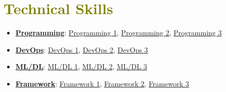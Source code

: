 

\section{\textcolor{olive}{\textbf{Technical Skills}}}

    \vspace{1.0mm}

    \begin{itemize}[
        leftmargin=0.20in, 
        label={-}, 
        itemsep=-2pt, 
        topsep=0pt,
        rightmargin=0.10in
    ]
        \item \underline{\textbf{Programming}}: \underline{Programming 1}, \underline{Programming 2}, \underline{Programming 3}
        \item \underline{\textbf{DevOps}}: \underline{DevOps 1}, \underline{DevOps 2}, \underline{DevOps 3}
        \item \underline{\textbf{ML/DL}}: \underline{ML/DL 1}, \underline{ML/DL 2}, \underline{ML/DL 3}
        \item \underline{\textbf{Framework}}: \underline{Framework 1}, \underline{Framework 2}, \underline{Framework 3}
    \end{itemize}
